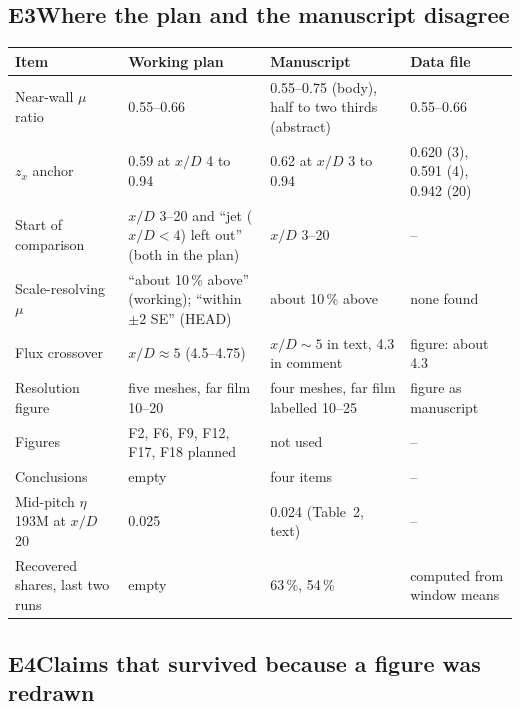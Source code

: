 \documentclass[10pt]{article}
\begin{document}
\subsection*{E3\quad Where the plan and the manuscript disagree}

{\footnotesize
\begin{longtable}{@{}L{3.6cm} L{4.3cm} L{4.3cm} L{4.2cm}@{}}
\toprule
Item & Working plan & Manuscript & Data file \\
\midrule
\endhead
Near-wall $\mu$ ratio & 0.55--0.66 & 0.55--0.75 (body), half to two thirds (abstract) & 0.55--0.66 \\
$z_x$ anchor & 0.59 at $x/D$ 4 to 0.94 & 0.62 at $x/D$ 3 to 0.94 & 0.620 (3), 0.591 (4), 0.942 (20) \\
Start of comparison & $x/D$ 3--20 and ``jet ($x/D<4$) left out'' (both in the plan) & $x/D$ 3--20 & -- \\
Scale-resolving $\mu$ & ``about 10\,\% above'' (working); ``within $\pm2$ SE'' (HEAD) & about 10\,\% above &
none found \\
Flux crossover & $x/D\approx5$ (4.5--4.75) & $x/D\sim5$ in text, 4.3 in comment & figure: about 4.3 \\
Resolution figure & five meshes, far film 10--20 & four meshes, far film labelled 10--25 & figure as manuscript \\
Figures & F2, F6, F9, F12, F17, F18 planned & not used & -- \\
Conclusions & empty & four items & -- \\
Mid-pitch $\eta$ 193M at $x/D$ 20 & 0.025 & 0.024 (Table~2, text) & -- \\
Recovered shares, last two runs & empty & 63\,\%, 54\,\% & computed from window means \\
\bottomrule
\end{longtable}}

\subsection*{E4\quad Claims that survived because a figure was redrawn}
\end{document}
